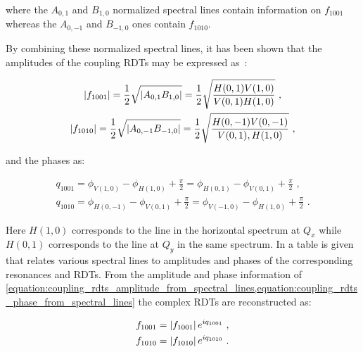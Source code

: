 \noindent
where the \(A_{0,1}\) and \(B_{1,0}\) normalized spectral lines contain information on \(f_{1001}\) whereas the \(A_{0,-1}\) and \(B_{-1,0}\) ones contain \(f_{1010}\).

By combining these normalized spectral lines, it has been shown that the amplitudes of the coupling RDTs may be expressed as~\cite{CERN:Franchi:Computation_Coupling_Resonance_Driving_Term_Single_BPM,PRAB:Tomas:CERN_LHC_OMC}:

\begin{equation}
  \begin{gathered}
    \left\lvert f_{1001} \right\rvert = \frac{1}{2} \sqrt{\left\lvert A_{0,1} B_{1,0} \right\rvert}   = \frac{1}{2} \sqrt{\frac{H(0,1) V(1,0)}{V(0,1) H(1,0)}}       \text{ ,}  \\
    \left\lvert f_{1010} \right\rvert = \frac{1}{2} \sqrt{\left\lvert A_{0,-1} B_{-1,0} \right\rvert} = \frac{1}{2} \sqrt{\frac{H(0,-1) V(0,-1)}{V(0,1), H(1,0)}}  \text{ ,}
  \end{gathered}
  \label{equation:coupling_rdts_amplitude_from_spectral_lines}
\end{equation}
\vspace{1pt}

\noindent
and the phases as:

\begin{equation}
  \begin{gathered}
    q_{1001} = \phi_{V(1,0)} -\phi_{H(1,0)} +\frac{\pi}{2} = \phi_{H(0,1)} - \phi_{V(0,1)} + \frac{\pi}{2}      \text{ ,}  \\
    q_{1010} = \phi_{H(0,-1)} -\phi_{V(0,1)} +\frac{\pi}{2} = \phi_{V(-1,0)} - \phi_{H(1,0)} + \frac{\pi}{2}    \text{ .}
  \end{gathered}
  \label{equation:coupling_rdts_phase_from_spectral_lines}
\end{equation}
\vspace{1pt}

Here \(H(1,0)\) corresponds to the line in the horizontal spectrum at \(Q_x\) while \(H(0, 1)\) corresponds to the line at \(Q_y\) in the same spectrum.
In \cite{PRAB:Franchi:First_Simultaneous} a table is given that relates various spectral lines to amplitudes and phases of the corresponding resonances and RDTs.
From the amplitude and phase information of \cref{equation:coupling_rdts_amplitude_from_spectral_lines,equation:coupling_rdts_phase_from_spectral_lines} the complex RDTs are reconstructed as:

\begin{equation}
  \begin{aligned}
    f_{1001} &= \left\lvert f_{1001} \right\rvert e^{i q_{1001}}  \text{ ,}  \\
    f_{1010} &= \left\lvert f_{1010} \right\rvert e^{i q_{1010}}  \text{ .}  \\
  \end{aligned}
  \label{equation:complex_coupling_rdts_from_phase_and_amplitude}
\end{equation}

